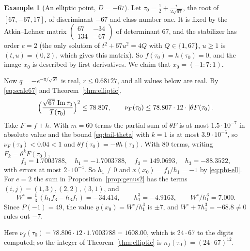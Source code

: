 \documentclass[11pt]{amsart}
\theoremstyle{definition}
\newtheorem{example}[theorem]{Example}
\theoremstyle{remark}
\newcommand{\im}{\operatorname{Im}}
\newcommand{\smat}[4]{\left(\begin{smallmatrix}#1&#2\\#3&#4\end{smallmatrix}\right)}
\begin{document}
\begin{example}[An elliptic point, $D=-67$]\label{ex:67}
Let $\tau_0=\tfrac12+\tfrac{i}{2\sqrt{67}}$, the root of $[67,-67,17]$, of
discriminant $-67$ and class number one.  It is fixed by the Atkin--Lehner
matrix $\smat{67}{-34}{134}{-67}$ of determinant $67$, and the stabilizer has
order $e=2$ (the only solution of $t^2+67u^2=4Q$ with $Q\in\{1,67\}$, $u\ge1$
is $(t,u)=(0,2)$, which gives this matrix).  So $f(\tau_0)=h(\tau_0)=0$, and the image $x_0$ is described by
first derivatives.  We claim that $x_0=(-1:7:1)$.

Now $q=-e^{-\pi/\sqrt{67}}$ is real, $r\le0.68127$, and all values below are
real.  By \eqref{eq:scale67} and Theorem~\ref{thm:elliptic},
\[
\Bigl(\frac{\sqrt{67}\,\im\tau_0}{T(\tau_0)}\Bigr)^2\le78.807,
\qquad
\nu_F(\tau_0)\le78.807\cdot12\cdot\lvert\theta F(\tau_0)\rvert .
\]
Take $F=f+h$.  With $m=60$ terms the partial sum of $\theta F$ is at most
$1.5\cdot10^{-7}$ in absolute value and the bound \eqref{eq:tail-theta} with
$k=1$ is at most $3.9\cdot10^{-5}$, so $\nu_F(\tau_0)<0.04<1$ and
$\theta f(\tau_0)=-\theta h(\tau_0)$.  With $80$ terms, writing
$F_k=\theta^kF(\tau_0)$,
\[
f_1=1.7003788,\quad h_1=-1.7003788,\quad
f_3=149.0693,\quad h_3=-88.3522,
\]
with errors at most $2\cdot10^{-4}$.  So $h_1\ne0$ and $x(x_0)=f_1/h_1=-1$ by
\eqref{eq:phi-ell}.  For $e=2$ the sum in Proposition~\ref{prop:genus2} has the
terms $(i,j)=(1,3),(2,2),(3,1)$, and
\[
W^\circ=\tfrac13\,(h_1f_3-h_3f_1)=-34.414,\qquad h_1^3=-4.9163,
\qquad W^\circ/h_1^3=7.000 .
\]
Since $P(-1)=49$, the value $y(x_0)=W^\circ/h_1^3$ is $\pm7$, and
$W^\circ+7h_1^3=-68.8\ne0$ rules out $-7$.

Here $\nu_f(\tau_0)=78.806\cdot12\cdot1.7003788=1608.00$, which is $24\cdot67$
to the digits computed; so the integer of Theorem~\ref{thm:elliptic} is
$n_f(\tau_0)=(24\cdot67)^{12}$.
\end{example}
\end{document}
